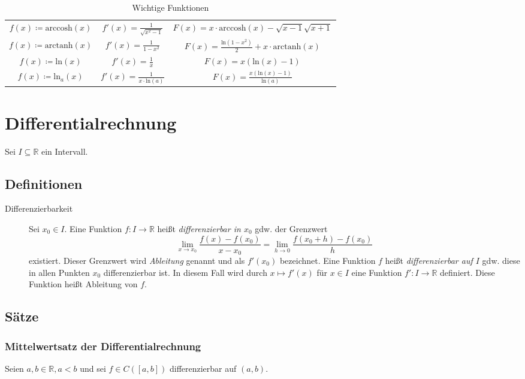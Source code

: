 \begin{table}[ht]
\begin{tabular}{| c | c | c |}
				$ f(x) \coloneqq \text{arccosh}(x) $ & $ f'(x) = \frac{1}{\sqrt{x ^ 2 - 1}} $     & $ F(x) = x \cdot \text{arccosh}(x) - \sqrt{x - 1} \sqrt{x + 1} $      \\
				$ f(x) \coloneqq \text{arctanh}(x) $ & $ f'(x) = \frac{1}{1 - x ^ 2} $            & $ F(x) = \frac{\text{ln}(1 - x ^ 2)}{2} + x \cdot \text{arctanh}(x) $ \\
				$ f(x) \coloneqq \text{ln}(x) $      & $ f'(x) = \frac{1}{x} $                    & $ F(x) = x (\text{ln}(x) - 1) $                                       \\
				$ f(x) \coloneqq \text{ln} _ a (x) $ & $ f'(x) = \frac{1}{x \cdot \text{ln}(a)} $ & $ F(x) = \frac{x (\text{ln}(x) - 1)}{\text{ln}(a)} $                  \\
				\hline
			\end{tabular}
			\caption{Wichtige Funktionen}
		\end{table}

\chapter{Differentialrechnung}
Sei $ I \subseteq \mathbb{R} $ ein Intervall.

\section{Definitionen}
	\begin{description}
		\item[Differenzierbarkeit] Sei $ x _ 0 \in I $. Eine Funktion $ f : I \rightarrow \mathbb{R} $ heißt \textit{differenzierbar in $ x _ 0 $} gdw. der Grenzwert \[ \lim _ { x \rightarrow x _ 0 } \frac{f(x) - f(x _ 0)}{x - x _ 0} = \lim _ { h \rightarrow 0 } \frac{f(x _ 0 + h) - f(x _ 0)}{h} \] existiert. Dieser Grenzwert wird \textit{Ableitung} genannt und als $ f'(x _ 0) $ bezeichnet. Eine Funktion $ f $ heißt \textit{differenzierbar auf $ I $} gdw. diese in allen Punkten $ x _ 0 $ differenzierbar ist. In diesem Fall wird durch $ x \mapsto f'(x) $ für $ x \in I $ eine Funktion $ f' : I \rightarrow \mathbb{R} $ definiert. Diese Funktion heißt Ableitung von $ f $.
	\end{description}

\section{Sätze}
	\subsection{Mittelwertsatz der Differentialrechnung}
		Seien $ a, b \in \mathbb{R}, a < b $ und sei $ f \in C([a, b]) $ differenzierbar auf $ (a, b) $.

